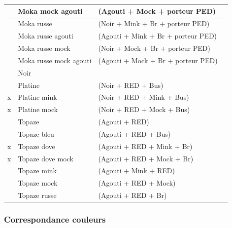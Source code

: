 ﻿\documentclass[a4paper,10pt]{article}
\begin{document}
\begin{longtable}{|c|l|l|l|}
& Moka mock agouti  & (Agouti + Mock +   porteur PED) & \\\hline
& Moka russe  & (Noir + Mink + Br + porteur  PED) & \\\hline
& Moka russe agouti  & (Agouti + Mink + Br +  porteur PED) & \\\hline
& Moka russe mock  & (Noir + Mock + Br + porteur PED) & \\\hline
& Moka russe mock agouti  & (Agouti + Mock +  Br + porteur PED) & \\\hline
& Noir & & \\\hline
& Platine  & (Noir + RED + Bus) & \\\hline
x & Platine mink  & (Noir + RED + Mink + Bus) & \\\hline
x & Platine mock  & (Noir + RED + Mock + Bus) & \\\hline
& Topaze  & (Agouti + RED) & \\\hline
& Topaze bleu  & (Agouti + RED + Bus)  & \\\hline
x & Topaze dove  & (Agouti + RED + Mink + Br) & \\\hline
x & Topaze dove mock  & (Agouti + RED + Mock + Br) & \\\hline
& Topaze mink  & (Agouti + Mink + RED) & \\\hline
& Topaze mock  & (Agouti + RED + Mock) & \\\hline
& Topaze russe  & (Agouti + RED + Br) & \\\hline
\end{longtable}

\subsubsection{Correspondance couleurs}
\end{document}
